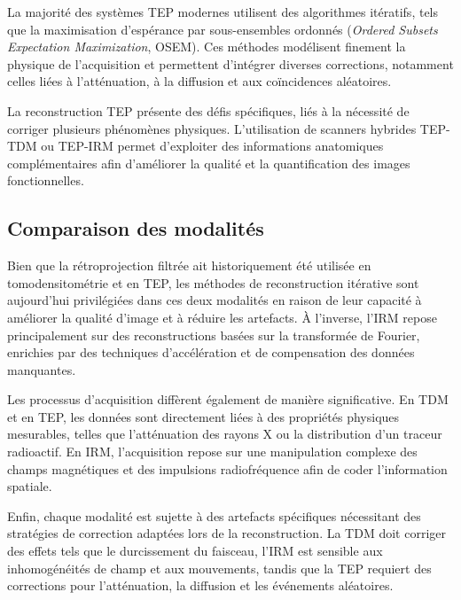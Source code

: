 La majorité des systèmes TEP modernes utilisent des algorithmes itératifs, tels que la maximisation d'espérance par sous-ensembles ordonnés (\emph{Ordered Subsets Expectation Maximization}, OSEM). Ces méthodes modélisent finement la physique de l'acquisition et permettent d'intégrer diverses corrections, notamment celles liées à l'atténuation, à la diffusion et aux coïncidences aléatoires.

La reconstruction TEP présente des défis spécifiques, liés à la nécessité de corriger plusieurs phénomènes physiques. L'utilisation de scanners hybrides TEP-TDM ou TEP-IRM permet d'exploiter des informations anatomiques complémentaires afin d'améliorer la qualité et la quantification des images fonctionnelles.

\subsection{Comparaison des modalités}

Bien que la rétroprojection filtrée ait historiquement été utilisée en tomodensitométrie et en TEP, les méthodes de reconstruction itérative sont aujourd'hui privilégiées dans ces deux modalités en raison de leur capacité à améliorer la qualité d'image et à réduire les artefacts. À l'inverse, l'IRM repose principalement sur des reconstructions basées sur la transformée de Fourier, enrichies par des techniques d'accélération et de compensation des données manquantes.

Les processus d'acquisition diffèrent également de manière significative. En TDM et en TEP, les données sont directement liées à des propriétés physiques mesurables, telles que l'atténuation des rayons X ou la distribution d'un traceur radioactif. En IRM, l'acquisition repose sur une manipulation complexe des champs magnétiques et des impulsions radiofréquence afin de coder l'information spatiale.

Enfin, chaque modalité est sujette à des artefacts spécifiques nécessitant des stratégies de correction adaptées lors de la reconstruction. La TDM doit corriger des effets tels que le durcissement du faisceau, l'IRM est sensible aux inhomogénéités de champ et aux mouvements, tandis que la TEP requiert des corrections pour l'atténuation, la diffusion et les événements aléatoires.

